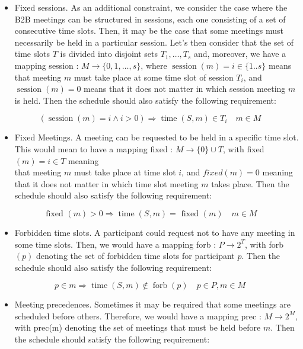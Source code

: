 \documentclass[10pt]{article}
\begin{document}
\begin{itemize}
  \item Fixed sessions. As an additional constraint, we consider the case where the B2B meetings can be structured in sessions, each one consisting of a set of consecutive time slots. Then, it may be the case that some meetings must necessarily be held in a particular session. Let's then consider that the set of time slots $T$ is divided into disjoint sets $T_{1}, \ldots, T_{s}$ and, moreover, we have a mapping session : $M \rightarrow\{0,1, \ldots, s\}$, where $\operatorname{session}(m)=i \in\{1 . . s\}$ means that meeting $m$ must take place at some time slot of session $T_{i}$, and $\operatorname{session}(m)=0$ means that it does not matter in which session meeting $m$ is held. Then the schedule should also satisfy the following requirement:
\end{itemize}

$$
(\operatorname{session}(m)=i \wedge i>0) \Longrightarrow \operatorname{time}(S, m) \in T_{i} \quad m \in M
$$

\begin{itemize}
  \item Fixed Meetings. A meeting can be requested to be held in a specific time slot. This would mean to have a mapping fixed : $M \rightarrow\{0\} \cup T$, with fixed $(m)=i \in T$ meaning\\
that meeting $m$ must take place at time slot $i$, and $f i x e d(m)=0$ meaning that it does not matter in which time slot meeting $m$ takes place. Then the schedule should also satisfy the following requirement:
\end{itemize}

$$
\text { fixed }(m)>0 \Longrightarrow \operatorname{time}(S, m)=\text { fixed }(m) \quad m \in M
$$

\begin{itemize}
  \item Forbidden time slots. A participant could request not to have any meeting in some time slots. Then, we would have a mapping forb : $P \rightarrow 2^{T}$, with forb $(p)$ denoting the set of forbidden time slots for participant $p$. Then the schedule should also satisfy the following requirement:
\end{itemize}

$$
p \in m \Longrightarrow \operatorname{time}(S, m) \notin \operatorname{forb}(p) \quad p \in P, m \in M
$$

\begin{itemize}
  \item Meeting precedences. Sometimes it may be required that some meetings are scheduled before others. Therefore, we would have a mapping prec : $M \rightarrow 2^{M}$, with prec(m) denoting the set of meetings that must be held before $m$. Then the schedule should satisfy the following requirement:
\end{itemize}
\end{document}
